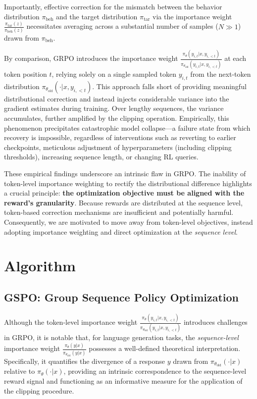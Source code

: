 Importantly, effective correction for the mismatch between the behavior distribution $\pi_\text{beh}$ and the target distribution $\pi_\text{tar}$ via the importance weight $\frac{ \pi_\text{tar} (z) }{ \pi_\text{beh} (z)}$ necessitates averaging across a substantial number of samples ($N \gg 1$) drawn from $\pi_\text{beh}$. 

By comparison, GRPO introduces the importance weight $\frac{ \pi_{\theta} (y_{i,t} | x, y_{i,<t}) }{ \pi_{\theta_\text{old}} (y_{i,t} | x,y_{i,<t})}$ at each token position $t$, relying solely on a single sampled token $y_{i,t}$ from the next-token distribution $\pi_{\theta_\text{old}}( \cdot | x, y_{i, <t})$. This approach falls short of providing meaningful distributional correction and instead injects considerable variance into the gradient estimates during training. Over lengthy sequences, the variance accumulates, further amplified by the clipping operation. Empirically, this phenomenon precipitates catastrophic model collapse—a failure state from which recovery is impossible, regardless of interventions such as reverting to earlier checkpoints, meticulous adjustment of hyperparameters (including clipping thresholds), increasing sequence length, or changing RL queries.

These empirical findings underscore an intrinsic flaw in GRPO. The inability of token-level importance weighting to rectify the distributional difference highlights a crucial principle: \textbf{the optimization objective must be aligned with the reward's granularity}. Because rewards are distributed at the sequence level, token-based correction mechanisms are insufficient and potentially harmful. Consequently, we are motivated to move away from token-level objectives, instead adopting importance weighting and direct optimization at the \textit{sequence level}.

\section{Algorithm}

\subsection{GSPO: Group Sequence Policy Optimization}

Although the token-level importance weight $\frac{ \pi_{\theta} (y_{i,t} | x, y_{i,<t}) }{ \pi_{\theta_\text{old}} (y_{i,t} | x,y_{i,<t})}$ introduces challenges in GRPO, it is notable that, for language generation tasks, the \textit{sequence-level} importance weight $\frac{ \pi_{\theta} (y | x) }{ \pi_{\theta_\text{old}} (y | x)}$ possesses a well-defined theoretical interpretation. Specifically, it quantifies the divergence of a response $y$ drawn from $\pi_{\theta_\text{old}} (\cdot | x)$ relative to $\pi_{\theta} (\cdot | x)$, providing an intrinsic correspondence to the sequence-level reward signal and functioning as an informative measure for the application of the clipping procedure.

